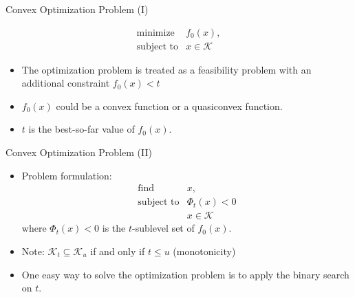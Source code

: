 \documentclass[10pt,ignorenonframetext,serif,onlymath]{beamer}
\begin{document}
\begin{frame}{Convex Optimization Problem (I)}
\protect\hypertarget{sec:convex-optimization-problem-i}{}

\[\begin{array}{ll}
    \text{minimize}     & f_0(x), \\
    \text{subject to}   & x \in \mathcal{K}
\end{array}\]

\begin{itemize}
\item
  The optimization problem is treated as a feasibility problem with an
  additional constraint \(f_0(x) < t\)
\item
  \(f_0(x)\) could be a convex function or a quasiconvex function.
\item
  \(t\) is the best-so-far value of \(f_0(x)\).
\end{itemize}

\end{frame}

\begin{frame}{Convex Optimization Problem (II)}
\protect\hypertarget{sec:convex-optimization-problem-ii}{}

\begin{itemize}
\item
  Problem formulation: \[\begin{array}{ll}
              \text{find}         & x, \\
              \text{subject to}   & \Phi_t(x) < 0 \\
                                  & x \in \mathcal{K}
    \end{array}\] where \(\Phi_t(x) < 0\) is the \(t\)-sublevel set of
  \(f_0(x)\).
\item
  Note: \(\mathcal{K}_t \subseteq \mathcal{K}_u\) if and only if
  \(t \leq u\) (monotonicity)
\item
  One easy way to solve the optimization problem is to apply the binary
  search on \(t\).
\end{itemize}

\end{frame}
\end{document}
